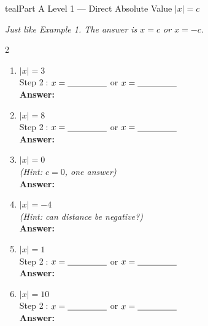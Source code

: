 \documentclass[12pt]{article}
\newcommand{\wspm}{\vspace{2.0cm}}
\newcommand{\blank}{\underline{\hspace{2.8cm}}}
\newcommand{\sblank}{\underline{\hspace{1.6cm}}}
\begin{document}
\newpage

\begin{partbox}{teal}{Part A \quad Level 1 --- Direct Absolute Value
  \hfill{\normalfont\small $|x| = c$}}

\textit{Just like Example 1. The answer is $x = c$ or $x = -c$.}
\vspace{8pt}
\begin{multicols}{2}
\begin{enumerate}[label=\textbf{\arabic*.}, itemsep=0pt]

  \item $|x| = 3$\\[3pt]
  Step \textcircled{2}: $x = \sblank$ or $x = \sblank$\\[3pt]
  \textbf{Answer:} \blank
  \wspm

  \item $|x| = 8$\\[3pt]
  Step \textcircled{2}: $x = \sblank$ or $x = \sblank$\\[3pt]
  \textbf{Answer:} \blank
  \wspm

  \item $|x| = 0$\\[3pt]
  \textit{(Hint: $c = 0$, one answer)}\\[3pt]
  \textbf{Answer:} \blank
  \wspm

  \item $|x| = -4$\\[3pt]
  \textit{(Hint: can distance be negative?)}\\[3pt]
  \textbf{Answer:} \blank
  \wspm

  \item $|x| = 1$\\[3pt]
  Step \textcircled{2}: $x = \sblank$ or $x = \sblank$\\[3pt]
  \textbf{Answer:} \blank
  \wspm

  \item $|x| = 10$\\[3pt]
  Step \textcircled{2}: $x = \sblank$ or $x = \sblank$\\[3pt]
  \textbf{Answer:} \blank
  \wspm

\end{enumerate}
\end{multicols}
\end{partbox}
\end{document}

